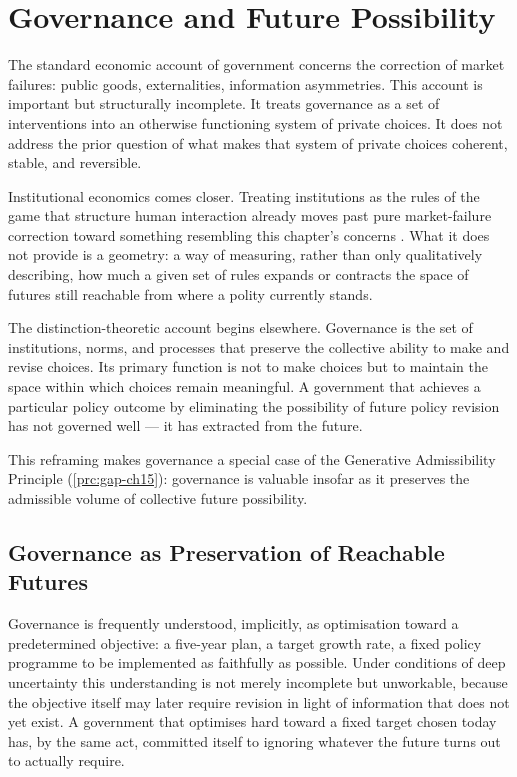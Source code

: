 \documentclass[12pt,twoside,openright]{book}
\begin{document}
\section{Governance and Future Possibility}

The standard economic account of government concerns
the correction of market failures: public goods,
externalities, information asymmetries. This account
is important but structurally incomplete. It treats
governance as a set of interventions into an otherwise
functioning system of private choices. It does not
address the prior question of what makes that system
of private choices coherent, stable, and reversible.

Institutional economics comes closer. Treating institutions
as the rules of the game that structure human interaction
already moves past pure market-failure correction toward
something resembling this chapter's concerns
\parencite{north1990}. What it does not provide is a
geometry: a way of measuring, rather than only qualitatively
describing, how much a given set of rules expands or
contracts the space of futures still reachable from where a
polity currently stands.

The distinction-theoretic account begins elsewhere.
Governance is the set of institutions, norms, and
processes that preserve the collective ability to make
and revise choices. Its primary function is not to
make choices but to maintain the space within which
choices remain meaningful. A government that achieves
a particular policy outcome by eliminating the
possibility of future policy revision has not governed
well — it has extracted from the future.

This reframing makes governance a special case of
the Generative Admissibility Principle
(\cref{prc:gap-ch15}): governance is valuable insofar
as it preserves the admissible volume of collective
future possibility.

\subsection{Governance as Preservation of Reachable Futures}
\label{sec:ch28-preservation}

Governance is frequently understood, implicitly, as
optimisation toward a predetermined objective: a five-year
plan, a target growth rate, a fixed policy programme to be
implemented as faithfully as possible. Under conditions of
deep uncertainty this understanding is not merely incomplete
but unworkable, because the objective itself may later
require revision in light of information that does not yet
exist. A government that optimises hard toward a fixed target
chosen today has, by the same act, committed itself to
ignoring whatever the future turns out to actually require.
\end{document}
